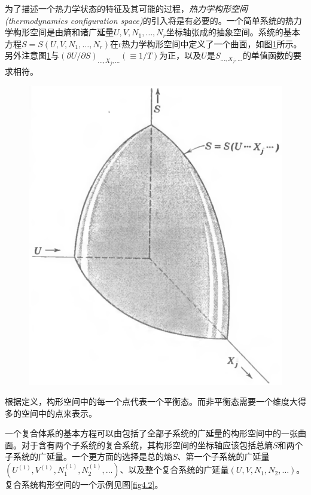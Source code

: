 为了描述一个热力学状态的特征及其可能的过程，{\it 热力学构形空间(thermodynamics configuration space)}的引入将是有必要的。一个简单系统的热力学构形空间是由熵和诸广延量$U, V, N_1,\dots ,N_r$坐标轴张成的抽象空间。系统的基本方程$S=S(U, V, N_1,\dots ,N_r)$在r热力学构形空间中定义了一个曲面，如图\ref{fig4.1}所示。另外注意图\ref{fig4.1}与$(\partial U/\partial S)_{\dots , X_j,\dots}(\equiv 1/T)$为正，以及$U$是$S_{\dots , X_j,\dots}$的单值函数的要求相符。
\begin{figure}
\includegraphics[width=.7\textwidth]{Pictures/fig4.1.png}
\label{fig4.1}
\end{figure}
根据定义，构形空间中的每一个点代表一个平衡态。而非平衡态需要一个维度大得多的空间中的点来表示。

一个复合体系的基本方程可以由包括了全部子系统的广延量的构形空间中的一张曲面。对于含有两个子系统的复合系统，其构形空间的坐标轴应该包括总熵$S$和两个子系统的广延量。一个更方面的选择是总的熵$S$、第一个子系统的广延量$(U^{(1)},V^{(1)},N^{(1)}_1,N^{(1)}_2,\dots)$、以及整个复合系统的广延量$(U,V,N_1,N_2,\dots)$。复合系统构形空间的一个示例见图\ref{fig4.2}。

